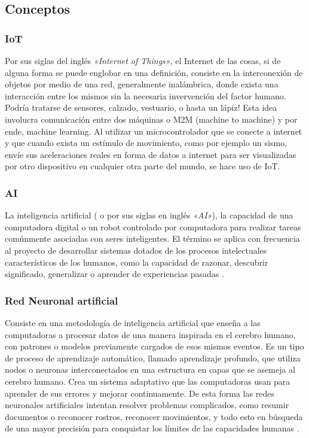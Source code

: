 \subsection{Conceptos}

\subsubsection{IoT}
Por sus siglas del inglés \textit{«Internet of Things»}, el Internet de las cosas, si de alguna forma se puede englobar en una definición, consiste en la interconexión de objetos por medio de una red, generalmente inalámbrica, donde exista una interacción entre los mismos sin la necesaria invervención del factor humano.\\
Podría tratarse de sensores, calzado, vestuario, o hasta un lápiz! Esta idea involucra comunicación entre dos máquinas o M2M (machine to machine) y por ende, machine learning. Al utilizar un microcontrolador que se conecte a internet y que cuando exista un estímulo de movimiento, como por ejemplo un sismo, envíe sus aceleraciones reales en forma de datos a internet para ser visualizadas por otro dispositivo en cualquier otra parte del mundo, se hace uso de IoT.
 
\subsubsection{AI}

La inteligencia artificial ( o por sus siglas en inglés \textit{«AI»}), la capacidad de una computadora digital o un robot controlado por computadora para realizar tareas comúnmente asociadas con seres inteligentes. El término se aplica con frecuencia al proyecto de desarrollar sistemas dotados de los procesos intelectuales característicos de los humanos, como la capacidad de razonar, descubrir significado, generalizar o aprender de experiencias pasadas \cite{AI}.

\subsubsection{Red Neuronal artificial}

Consiste en una metodología de inteligencia artificial que enseña a las computadoras a procesar datos de una manera inspirada en el cerebro humano, con patrones o modelos previamente cargados de esos mismos eventos. Es un tipo de proceso de aprendizaje automático, llamado aprendizaje profundo, que utiliza nodos o neuronas interconectados en una estructura en capas que se asemeja al cerebro humano. Crea un sistema adaptativo que las computadoras usan para aprender de sus errores y mejorar continuamente. De esta forma las redes neuronales artificiales intentan resolver problemas complicados, como resumir documentos o reconocer rostros, reconocer movimientos, y todo esto en búsqueda de una mayor precisión para conquistar los límites de las capacidades humanas \cite{ANN}.

